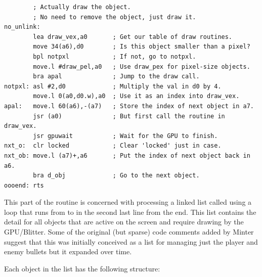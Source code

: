 \begin{lstlisting}
        ; Actually draw the object.
        ; No need to remove the object, just draw it.
no_unlink:
        lea draw_vex,a0       ; Get our table of draw routines.
        move 34(a6),d0        ; Is this object smaller than a pixel?
        bpl notpxl            ; If not, go to notpxl.
        move.l #draw_pel,a0   ; Use draw_pex for pixel-size objects.
        bra apal              ; Jump to the draw call.
notpxl: asl #2,d0             ; Multiply the val in d0 by 4.
        move.l 0(a0,d0.w),a0  ; Use it as an index into draw_vex.
apal:   move.l 60(a6),-(a7)   ; Store the index of next object in a7.
        jsr (a0)              ; But first call the routine in draw_vex.
        jsr gpuwait           ; Wait for the GPU to finish.
nxt_o:  clr locked            ; Clear 'locked' just in case.
nxt_ob: move.l (a7)+,a6       ; Put the index of next object back in a6.
        bra d_obj             ; Go to the next object.
oooend: rts

\end{lstlisting}

This part of the  routine is concerned with processing a linked list called
 using a loop that runs from  to  in the second
last line from the end. This  list contains the detail for all objects that
are active on the screen and require drawing by the GPU/Blitter. Some of the original (but sparse)
code comments added by Minter suggest that this was initially conceived as a list for managing just
the player and enemy bullets but it expanded over time. 

Each object in the  list has the following structure:

